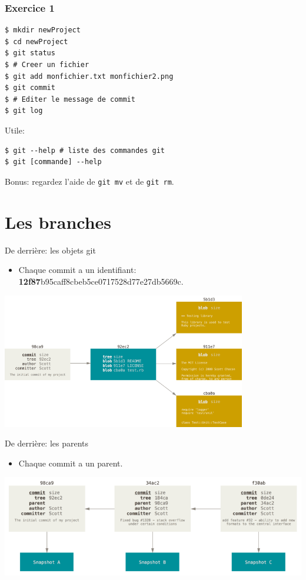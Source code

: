 \documentclass{beamer}
\begin{document}
\begin{frame}[fragile]
\frametitle{Exercice 1}
\begin{lstlisting}
$ mkdir newProject
$ cd newProject
$ git status
$ # Creer un fichier
$ git add monfichier.txt monfichier2.png
$ git commit
$ # Editer le message de commit
$ git log
\end{lstlisting}
Utile:
\begin{lstlisting}
$ git --help # liste des commandes git
$ git [commande] --help
\end{lstlisting}
Bonus: regardez l'aide de \texttt{git mv} et de \texttt{git rm}.
\end{frame}

\section{Les branches}

\begin{frame}{De derrière: les objets git}
    \begin{itemize}
        \item Chaque commit a un identifiant: \textbf{12f87}b95caff8cbeb5ce0717528d77e27db5669c.
    \end{itemize}
    \includegraphics[width=0.8\textwidth]{img/commit-and-tree.png}
\end{frame}

\begin{frame}{De derrière: les parents}
    \begin{itemize}
        \item Chaque commit a un parent.
    \end{itemize}
    \includegraphics[width=\textwidth]{img/commits-and-parents.png}
\end{frame}
\end{document}
